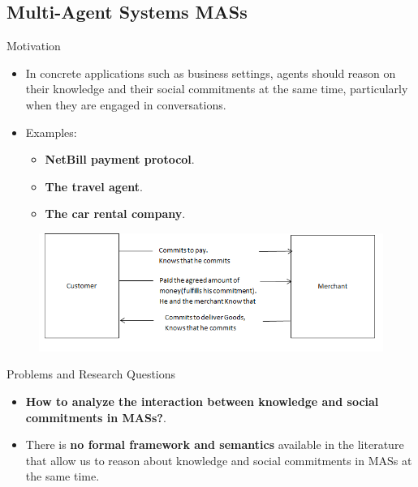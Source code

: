 \documentclass{beamer}
\begin{document}
\subsection{Multi-Agent Systems MASs}
    \begin{frame}{Motivation}
    \begin{itemize}
    \item In concrete applications such as business settings, agents should reason on their knowledge and their social commitments at the same time, particularly when they are engaged in conversations.
    \item Examples:
     \begin{itemize}
      \item \textbf{NetBill payment protocol}.
      \item \textbf{The travel agent}.
      \item \textbf{The car rental company}.
     \end{itemize}
\end{itemize}
\begin{figure}[htbp]
\centering
\includegraphics[width=1.0 \columnwidth]{figures/figure7.png}
\end{figure}
    \end{frame}
\begin{frame}{Problems and Research Questions}

\begin{itemize}
\item \textbf{How to analyze the interaction between knowledge and social commitments in MASs?}.
\item There is \textbf{no formal framework and semantics} available in the
literature that allow us to reason about knowledge and social commitments in MASs at the same time.


\end{itemize}

\end{frame}
\end{document}
